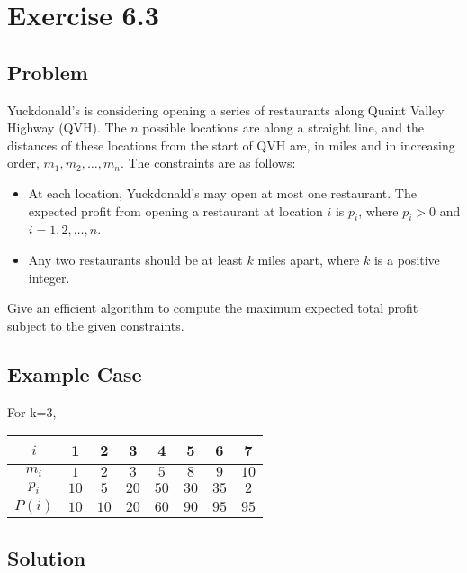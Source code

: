 \documentclass[12pt, letterpaper]{article}
\begin{document}
\section{Exercise 6.3}

\subsection{Problem}

Yuckdonald's is considering opening a series of restaurants along Quaint Valley Highway (QVH). The \(n\) possible locations are along a straight line, and the distances of these locations from the start of QVH are, in miles and in increasing order, \(m_1, m_2, \dots, m_n\). The constraints are as follows:

\begin{itemize}
    \item At each location, Yuckdonald's may open at most one restaurant. The expected profit from opening a restaurant at location \(i\) is \(p_i\), where \(p_i > 0\) and \(i = 1,2,\dots,n\).
    \item Any two restaurants should be at least \(k\) miles apart, where \(k\) is a positive integer.
\end{itemize}
    
Give an efficient algorithm to compute the maximum expected total profit subject to the given constraints.

\subsection{Example Case}

\begin{center}
    For k=3,
\begin{tabular}{|c|c|c|c|c|c|c|c|}
    \hline
    \(i\) & 1 & 2 & 3 & 4 & 5 & 6 & 7 \\
    \hline
    \hline
    \(m_i\) & \(1\) & \(2\) & \(3\) & \(5\) & \(8\) & \(9\) & \(10\) \\
    \hline
    \(p_i\) & \(10\) & \(5\) & \(20\) & \(50\) & \(30\) & \(35\) & \(2\) \\
    \hline
    \(P(i)\) & \boldmath\(10\) & \(10\) & \(20\) & \boldmath\(60\) & \(90\) & \boldmath\(95\) & \(95\) \\
    \hline
\end{tabular}
\end{center}

\subsection{Solution}
\end{document}
